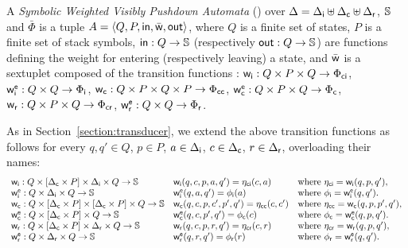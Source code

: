 \begin{definition}
A \emph{Symbolic Weighted Visibly Pushdown Automata} (\SWVPA)
over  $\Delta = {\Delta_\mathsf{i}} \uplus {\Delta_\mathsf{c}} \uplus {\Delta_\mathsf{r}}$, $\mathbb{S}$ and $\bar\Phi$
is a tuple $A = \< Q, P, \init, \bar\wei, \final >$,
where $Q$ is a finite set of states,
$P$ is a finite set of stack symbols,
$\mathsf{in} : Q \to \mathbb{S}$
(respectively $\mathsf{out} : Q \to \mathbb{S}$)
are functions defining the weight for entering
(respectively leaving) a state,
and $\bar{\mathsf{w}}$ is a sextuplet composed of the transition functions :
${\mathsf{w}_\mathsf{i}} : Q \times P \times Q \to {\Phi_\mathsf{ci}}$,
$\weiei : Q \times Q \to \Phii$,
${\mathsf{w}_\mathsf{c}} : Q \times P \times Q \times P \to {\Phi_\mathsf{cc}}$,
$\weiec : Q \times P \times Q \to \Phic$,
${\mathsf{w}_\mathsf{r}} : Q \times P \times Q \to {\Phi_\mathsf{cr}}$,
$\weier : Q \times Q \to \Phir$.
\end{definition}
%
As in Section~\ref{section:transducer},
we extend the above transition functions as follows
for every $q, q' \in Q$, $p \in P$,
$a \in {\Delta_\mathsf{i}}$,
$c \in {\Delta_\mathsf{c}}$,
$r \in {\Delta_\mathsf{r}}$,
overloading their names: %
\[
\begin{array}{lll}
\weii: Q \times [\Deltac \times P] \times \Deltai \times Q \to \Semiring &
\weii(q, c, p, a, q') = \eta_\mathsf{ci}(c, a) &
\mathrm{where~} \eta_\mathsf{ci} = \weii(q, p, q'),\\
%
\weiei: Q \times \Deltai \times Q \to \Semiring &
\weiei(q, a, q') = \phi_\mathsf{i}(a) &
\mathrm{where~} \phi_\mathsf{i} = \weiei(q, q').\\
%
\weic: Q \times [\Deltac \times P] \times  [\Deltac \times P] \times Q \to \Semiring &
\weic(q, c, p, \call{c'}, p', q') = \eta_\mathsf{cc}(c, \call{c'}) &
\mathrm{where~} \eta_\mathsf{cc} = \weic(q, p, p', q'),\\
%
\weiec: Q \times [\Deltac \times P] \times Q \to \Semiring &
\weiec(q, {\call{c}}, p', q') = \phi_\mathsf{c}({\call{c}}) &
\mathrm{where~} \phi_\mathsf{c} = \weiec(q, p, q').\\
%
\weir: Q \times [\Deltac \times P] \times \Deltar \times Q \to \Semiring &
\weir(q, {\call{c}},  p, {\return{r}}, q') = \eta_\mathsf{cr}({\call{c}},  {\return{r}}) &
\mathrm{where~} \eta_\mathsf{cr} = \weir(q, p, q'),\\
%
\weier: Q \times \Deltar \times Q \to \Semiring &
\weier(q, {\return{r}}, q') = \phi_\mathsf{r}({\return{r}}) &
\mathrm{where~} \phi_\mathsf{r} = \weier(q, q').\\
\end{array}
\]
